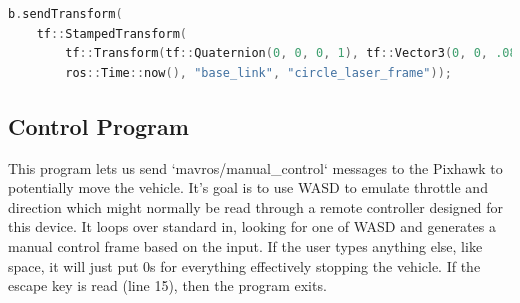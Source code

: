 \documentclass[onecolumn, draftclsnofoot, 10pt, compsoc]{IEEEtran}
\begin{document}
\begin{lstlisting}[language=C++]
b.sendTransform(
	tf::StampedTransform(
		tf::Transform(tf::Quaternion(0, 0, 0, 1), tf::Vector3(0, 0, .08)),
		ros::Time::now(), "base_link", "circle_laser_frame"));
\end{lstlisting}

\subsection{Control Program}

This program lets us send `mavros/manual\_control` messages to the Pixhawk to potentially move the vehicle. It's goal is to use WASD to emulate throttle and direction which might normally be read through a remote controller designed for this device. It loops over standard in, looking for one of WASD and generates a manual control frame based on the input. If the user types anything else, like space, it will just put 0s for everything effectively stopping the vehicle. If the escape key is read (line 15), then the program exits.
\end{document}
